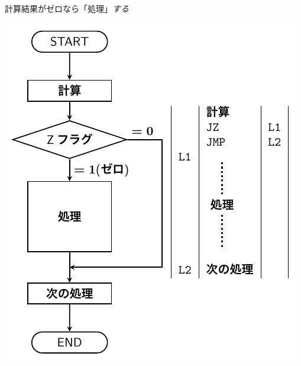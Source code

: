 \documentclass[handout]{beamer}        %
\begin{document}
\begin{frame}
\begin{minipage}{0.5\columnwidth}
\begin{itembox}[l]{\footnotesize 計算結果がゼロなら「処理」\emph{する}}
      \centerline{\includegraphics[scale=0.6]{../Tikz/flow2A.pdf}}
    \end{itembox}
  \end{minipage}
  \vfill
\end{frame}
\end{document}
